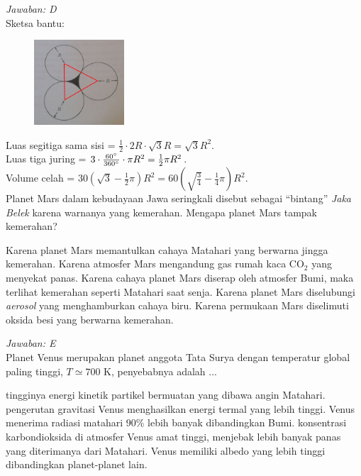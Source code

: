 \documentclass[11pt,fleqn]{exam}
\begin{document}
\begin{questions}
\textit{Jawaban: D}\\
Sketsa bantu:
\begin{figure}[H]
\centering
\includegraphics[width=0.3\textwidth]{gambar/pendingin_roket_sol.png}
\end{figure}
Luas segitiga sama sisi = $ \frac{1}{2} \cdot 2R \cdot \sqrt{3} R = \sqrt{3} R^2$.\\
Luas tiga juring = $ 3 \cdot \frac{60\degree}{360\degree} \cdot \pi R^2 = \frac{1}{2} \pi R^2$.\\
Volume celah = $ 30 \left(\sqrt{3} - \frac{1}{2}\pi \right)R^2 = 60 \left(\sqrt{\frac{3}{4}} - \frac{1}{4}\pi \right)R^2$.\\


\question Planet Mars dalam kebudayaan Jawa seringkali disebut sebagai ``bintang'' \textit{Jaka Belek} karena warnanya yang kemerahan. Mengapa planet Mars tampak kemerahan?
\begin{choices}
\choice Karena planet Mars memantulkan cahaya Matahari yang berwarna jingga kemerahan.
\choice Karena atmosfer Mars mengandung gas rumah kaca $\text{CO}_2$ yang menyekat panas.
\choice Karena cahaya planet Mars diserap oleh atmosfer Bumi, maka terlihat kemerahan seperti Matahari saat senja.
\choice Karena planet Mars diselubungi \textit{aerosol} yang menghamburkan cahaya biru.
\choice Karena permukaan Mars diselimuti oksida besi yang berwarna kemerahan.
\end{choices}

\textit{Jawaban: E}\\


\question Planet Venus merupakan planet anggota Tata Surya dengan temperatur global paling tinggi, $T\simeq 700$ K, penyebabnya adalah ...
\begin{choices}
\choice tingginya energi kinetik partikel bermuatan yang dibawa angin Matahari.
\choice pengerutan gravitasi Venus menghasilkan energi termal yang lebih tinggi.
\choice Venus menerima radiasi matahari 90\% lebih banyak dibandingkan Bumi.
\choice konsentrasi karbondioksida di atmosfer Venus amat tinggi, menjebak lebih banyak panas yang diterimanya dari Matahari.
\choice Venus memiliki albedo yang lebih tinggi dibandingkan planet-planet lain.
\end{choices}


\end{questions}
\end{document}
